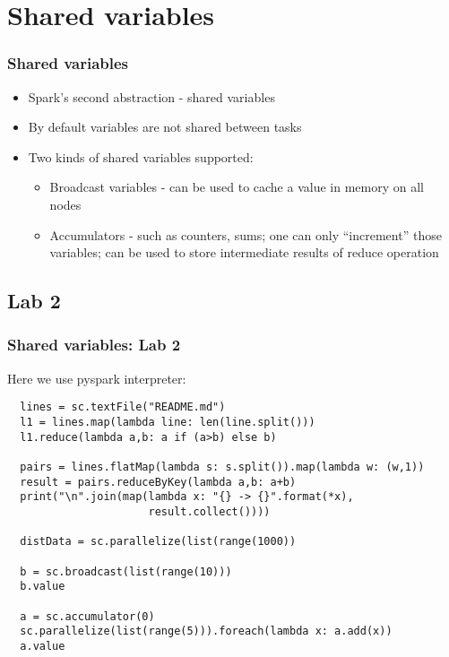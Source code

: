 \section{Shared variables}
\begin{frame}
  \frametitle{Shared variables}
  \begin{itemize}
   \item Spark's second abstraction - {\color{mycolordef}shared variables}
   \item By default variables are not shared between tasks
   \item Two kinds of shared variables supported:
    \begin{itemize}
      \item {\color{mycolordef}Broadcast variables} - can be used to cache a value in memory on all nodes
      \item {\color{mycolordef}Accumulators} - such as counters, sums; one can only ``increment'' those variables; can be used to store intermediate results of reduce operation
    \end{itemize}	
  \end{itemize} 
\end{frame}

\subsection{Lab 2}
\begin{frame}[fragile]
  \frametitle{Shared variables: Lab 2}
Here we use pyspark interpreter:
{\small
{\color{mycolorcode}
\begin{verbatim}
  lines = sc.textFile("README.md")
  l1 = lines.map(lambda line: len(line.split()))
  l1.reduce(lambda a,b: a if (a>b) else b)

  pairs = lines.flatMap(lambda s: s.split()).map(lambda w: (w,1))
  result = pairs.reduceByKey(lambda a,b: a+b)
  print("\n".join(map(lambda x: "{} -> {}".format(*x), 
                      result.collect())))

  distData = sc.parallelize(list(range(1000))

  b = sc.broadcast(list(range(10)))
  b.value

  a = sc.accumulator(0)
  sc.parallelize(list(range(5))).foreach(lambda x: a.add(x))
  a.value
\end{verbatim}
}
}

\end{frame}
